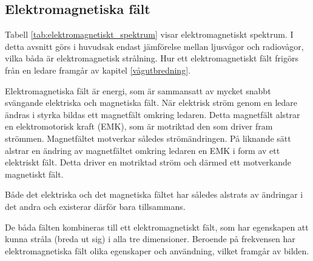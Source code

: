 \subsection{Elektromagnetiska fält}

Tabell \ref{tab:elektromagnetiskt_spektrum} visar elektromagnetiskt spektrum.
I detta avsnitt görs i huvudsak endast jämförelse mellan ljusvågor och
radiovågor, vilka båda är elektromagnetisk strålning.
Hur ett elektromagnetiskt fält frigörs från en ledare framgår av kapitel
\ref{vågutbredning}.

Elektromagnetiska fält är energi, som är sammansatt av mycket snabbt svängande
elektriska och magnetiska fält.
När elektrisk ström genom en ledare ändras i styrka bildas ett magnetfält
omkring ledaren.
Detta magnetfält alstrar en elektromotorisk kraft (EMK), som är motriktad den
som driver fram strömmen.
Magnetfältet motverkar således strömändringen.
På liknande sätt alstrar en ändring av magnetfältet omkring ledaren en EMK i
form av ett elektriskt fält.
Detta driver en motriktad ström och därmed ett motverkande magnetiskt fält.

Både det elektriska och det magnetiska fältet har således alstrats av ändringar
i det andra och existerar därför bara tillsammans.

De båda fälten kombineras till ett elektromagnetiskt fält, som har egenskapen
att kunna stråla (breda ut sig) i alla tre dimensioner.
Beroende på frekvensen har elektromagnetiska fält olika egenskaper och
användning, vilket framgår av bilden.

